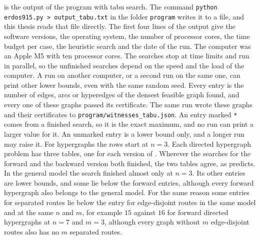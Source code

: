  is the output of the program with tabu search.
The command \texttt{python erdos915.py > output\_tabu.txt} in the folder \texttt{program} writes it to a file, and this thesis reads that file directly.
The first four lines of the output give the software versions, the operating system, the number of processor cores, the time budget per case, the heuristic search and the date of the run. The computer was an Apple M5 with ten processor cores.
The searches stop at time limits and run in parallel, so the unfinished searches depend on the speed and the load of the computer. A run on another computer, or a second run on the same one, can print other lower bounds, even with the same random seed.
Every entry is the number of edges, arcs or hyperedges of the densest feasible graph found, and every one of these graphs passed its certificate. The same run wrote these graphs and their certificates to \texttt{program/witnesses\_tabu.json}.
An entry marked \texttt{*} comes from a finished search, so it is the exact maximum, and no run can print a larger value for it.
An unmarked entry is a lower bound only, and a longer run may raise it.
For hypergraphs the rows start at $n=3$.
Each directed hypergraph problem has three tables, one for each version of .
Wherever the searches for the forward and the backward version both finished, the two tables agree, as  predicts.
In the general model the search finished almost only at $n=3$. Its other entries are lower bounds, and some lie below the forward entries, although every forward hypergraph also belongs to the general model.
For the same reason some entries for separated routes lie below the entry for edge-disjoint routes in the same model and at the same $n$ and $m$, for example $15$ against $16$ for forward directed hypergraphs at $n=7$ and $m=3$, although every graph without $m$ edge-disjoint routes also has no $m$ separated routes.

{}
\newcommand{\outputfile}{program/output_tabu.txt}
\newcommand{\outputtable}[2]{%
  \begin{minipage}[t]{0.47\textwidth}
  
  \end{minipage}}
\newcommand{\outputpair}[4]{\noindent\outputtable{#1}{#2}\hfill\outputtable{#3}{#4}\par\medskip}
\outputpair{8}{15}{17}{24}
\outputpair{26}{33}{35}{42}
\outputpair{44}{50}{52}{58}
\outputpair{60}{66}{68}{74}
\outputpair{76}{83}{85}{92}
\outputpair{94}{101}{103}{110}
\outputpair{112}{118}{120}{126}
\outputpair{128}{134}{136}{142}
\outputpair{144}{150}{152}{158}
\outputpair{160}{166}{168}{174}
\outputpair{176}{182}{184}{190}
\outputpair{192}{198}{200}{206}

